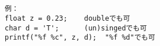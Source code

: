 \documentclass[a4j]{jarticle}
\begin{document}
\begin{multicols*}{2}
\ifnum {}
\begin{verbatim}






\end{verbatim}
\else
\begin{verbatim}
例：
float z = 0.23;    doubleでも可
char d = 'T';      (un)singedでも可
printf("%f %c", z, d);  "%f %d"でも可


\end{verbatim}
\fi
%
%
%
%








\end{multicols*}
\end{document}
